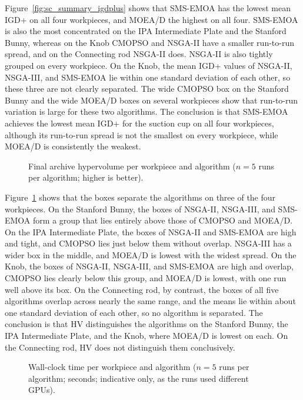 Figure~\ref{fig:sc_summary_igdplus} shows that SMS-EMOA has the lowest mean IGD+ on all four
workpieces, and MOEA/D the highest on all four. SMS-EMOA is also the most concentrated on the
IPA Intermediate Plate and the Stanford Bunny, whereas on the Knob CMOPSO and NSGA-II have a
smaller run-to-run spread, and on the Connecting rod NSGA-II does. NSGA-II is also tightly
grouped on every workpiece. On the Knob, the mean IGD+ values of NSGA-II, NSGA-III, and
SMS-EMOA lie within one standard deviation of each other, so these three are not clearly
separated.
The wide CMOPSO box on the Stanford Bunny and the wide MOEA/D boxes on several workpieces show
that run-to-run variation is large for these two algorithms. The conclusion is that SMS-EMOA
achieves the lowest mean IGD+ for the suction cup on all four workpieces, although its
run-to-run spread is not the smallest on every workpiece, while MOEA/D is consistently the
weakest.

\begin{figure}[H]
    \centering
    \caption{Final archive hypervolume per workpiece and algorithm ($n=5$ runs per algorithm;
    higher is better).}
    \label{fig:sc_summary_hv}
\end{figure}

Figure~\ref{fig:sc_summary_hv} shows that the boxes separate the algorithms on three of the
four workpieces. On the Stanford Bunny, the boxes of NSGA-II, NSGA-III, and SMS-EMOA form a
group that lies entirely above those of CMOPSO and MOEA/D. On the IPA Intermediate Plate, the
boxes of NSGA-II and SMS-EMOA are high and tight, and CMOPSO lies just below them without
overlap. NSGA-III has a wider box in the middle, and MOEA/D is lowest with the widest spread.
On the Knob, the boxes of NSGA-II, NSGA-III, and SMS-EMOA are high and overlap, CMOPSO lies
clearly below this group, and MOEA/D is lowest, with one run well above its box. On the
Connecting rod, by contrast, the boxes of all five algorithms overlap across nearly the same
range, and the means lie within about one standard deviation of each other, so no algorithm
is separated. The conclusion is that HV distinguishes the algorithms on the Stanford Bunny,
the IPA Intermediate Plate, and the Knob, where MOEA/D is lowest on each. On the Connecting
rod, HV does not distinguish them conclusively.

\begin{figure}[H]
    \centering
    \caption{Wall-clock time per workpiece and algorithm ($n=5$ runs per algorithm; seconds;
    indicative only, as the runs used different GPUs).}
    \label{fig:sc_summary_runtime}
\end{figure}

